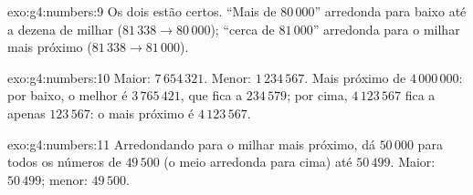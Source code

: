 \begin{solution}{exo:g4:numbers:9}
Os dois estão certos. ``Mais de $80\,000$'' arredonda para baixo até
a dezena de milhar ($81\,338 \to 80\,000$); ``cerca de $81\,000$''
arredonda para o milhar mais próximo ($81\,338 \to 81\,000$).
\end{solution}

\begin{solution}{exo:g4:numbers:10}
Maior: $7\,654\,321$. Menor: $1\,234\,567$. Mais próximo de
$4\,000\,000$: por baixo, o melhor é $3\,765\,421$, que fica a
$234\,579$; por cima, $4\,123\,567$ fica a apenas $123\,567$: o mais
próximo é $4\,123\,567$.
\end{solution}

\begin{solution}{exo:g4:numbers:11}
Arredondando para o milhar mais próximo, dá $50\,000$ para todos os
números de $49\,500$ (o meio arredonda para cima) até $50\,499$.
Maior: $50\,499$; menor: $49\,500$.
\end{solution}

